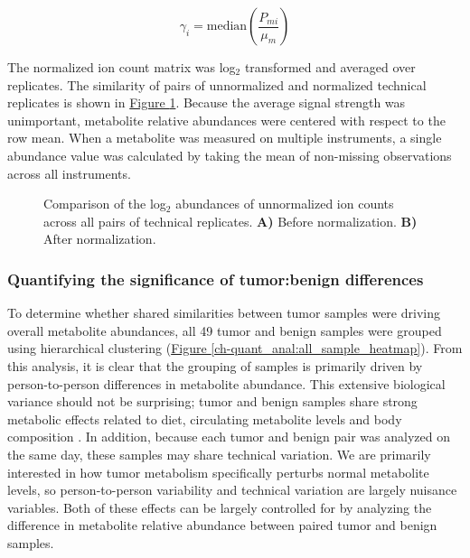 \begin{equation}
\gamma_{i} = \text{median}\left(\frac{P_{mi}}{\mu_{m}}\right)
\label{ch-quant_anal:normal}
\end{equation}

The normalized ion count matrix was log$_{2}$ transformed and averaged over replicates.  The similarity of pairs of unnormalized and normalized technical replicates is shown in \hyperref[ch-quant_anal:replicate_corr]{Figure \ref{ch-quant_anal:replicate_corr}}.  Because the average signal strength was unimportant, metabolite relative abundances were centered with respect to the row mean.  When a metabolite was measured on multiple instruments, a single abundance value was calculated by taking the mean of non-missing observations across all instruments.

\begin{figure}[h!]
\begin{center}
\hspace{1mm}

\caption[Comparison of the log$_{2}$ abundances of unnormalized ion counts for pairs of technical replicates]{Comparison of the log$_{2}$ abundances of unnormalized ion counts across all pairs of technical replicates.  \textbf{A)} Before normalization. \textbf{B)} After normalization.}
\label{ch-quant_anal:replicate_corr}
\end{center}
\end{figure}

\subsubsection{Quantifying the significance of tumor:benign differences}

To determine whether shared similarities between tumor samples were driving overall metabolite abundances, all 49 tumor and benign samples were grouped using hierarchical clustering (\hyperref[ch-quant_anal:all_sample_heatmap]{Figure \ref{ch-quant_anal:all_sample_heatmap}}). From this analysis, it is clear that the grouping of samples is primarily driven by person-to-person differences in metabolite abundance.  This extensive biological variance should not be surprising; tumor and benign samples share strong metabolic effects related to diet, circulating metabolite levels and body composition \cite{Kastenmuller:2015bk}.  In addition, because each tumor and benign pair was analyzed on the same day, these samples may share technical variation.  We are primarily interested in how tumor metabolism specifically perturbs normal metabolite levels, so person-to-person variability and technical variation are largely nuisance variables. Both of these effects can be largely controlled for by analyzing the difference in metabolite relative abundance between paired tumor and benign samples. 


